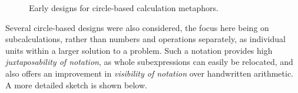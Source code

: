 \documentclass[12pt,twoside,notitlepage,xetex]{report}
\begin{document}
\begin{center}
\begin{figure}[H]
\begin{center}
{{\begin{center}
\end{center}}}
\end{center}
\caption{Early designs for circle-based calculation metaphors.}
\label{fig:Circs1}
\end{figure}
\end{center}

Several circle-based designs were also considered, the focus here being on subcalculations, rather than numbers and operations separately, as individual units within a larger solution to a problem.  Such a notation provides high \emph{juxtaposability of notation}, as whole subexpressions can easily be relocated, and also offers an improvement in \emph{visibility of notation} over handwritten arithmetic.  A more detailed sketch is shown below.
\end{document}

